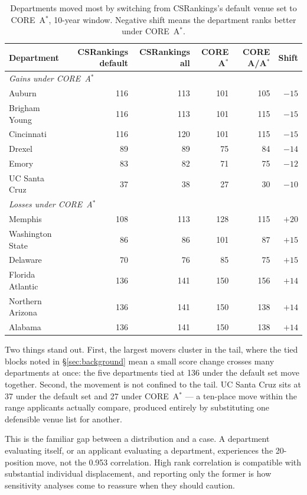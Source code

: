 \documentclass[11pt]{article}
\newcommand{\csr}{CSRankings}
\begin{document}
\begin{table}[t]
\centering
\small
\caption{Departments moved most by switching from \csr{}'s default venue set to
CORE~A$^*$, 10-year window. Negative shift means the department ranks better
under CORE~A$^*$.}
\label{tab:venuemovers}
\begin{tabular}{lrrrrr}
\toprule
Department & \csr{} default & \csr{} all & CORE A$^*$ & CORE A/A$^*$ & Shift \\
\midrule
\multicolumn{6}{l}{\emph{Gains under CORE~A$^*$}} \\
Auburn                & 116 & 113 & 101 & 105 & $-15$ \\
Brigham Young         & 116 & 113 & 101 & 115 & $-15$ \\
Cincinnati            & 116 & 120 & 101 & 115 & $-15$ \\
Drexel                & 89  & 89  & 75  & 84  & $-14$ \\
Emory                 & 83  & 82  & 71  & 75  & $-12$ \\
UC Santa Cruz         & 37  & 38  & 27  & 30  & $-10$ \\
\midrule
\multicolumn{6}{l}{\emph{Losses under CORE~A$^*$}} \\
Memphis               & 108 & 113 & 128 & 115 & $+20$ \\
Washington State      & 86  & 86  & 101 & 87  & $+15$ \\
Delaware              & 70  & 76  & 85  & 75  & $+15$ \\
Florida Atlantic      & 136 & 141 & 150 & 156 & $+14$ \\
Northern Arizona      & 136 & 141 & 150 & 138 & $+14$ \\
Alabama               & 136 & 141 & 150 & 138 & $+14$ \\
\bottomrule
\end{tabular}
\end{table}

Two things stand out. First, the largest movers cluster in the tail, where the
tied blocks noted in \S\ref{sec:background} mean a small score change crosses
many departments at once: the five departments tied at 136 under the default
set move together. Second, the movement is not confined to the tail. UC Santa
Cruz sits at 37 under the default set and 27 under CORE~A$^*$ --- a ten-place
move within the range applicants actually compare, produced entirely by
substituting one defensible venue list for another.

This is the familiar gap between a distribution and a case. A department
evaluating itself, or an applicant evaluating a department, experiences the
20-position move, not the 0.953 correlation. High rank correlation is
compatible with substantial individual displacement, and reporting only the
former is how sensitivity analyses come to reassure when they should caution.
\end{document}
